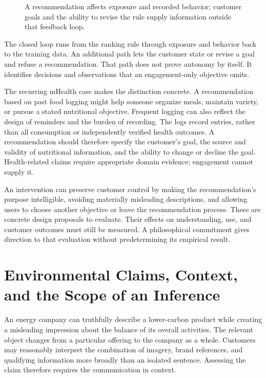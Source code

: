 \begin{figure}[htbp]
\centering

\caption{A recommendation affects exposure and recorded behavior; customer goals and the ability to revise the rule supply information outside that feedback loop.}\label{fig:M09_goal_revision}
\end{figure}

The closed loop runs from the ranking rule through exposure and behavior
back to the training data. An additional path lets the customer state or
revise a goal and refuse a recommendation. That path does not prove
autonomy by itself. It identifies decisions and observations that an
engagement-only objective omits.

The recurring mHealth case makes the distinction concrete. A
recommendation based on past food logging might help someone organize
meals, maintain variety, or pursue a stated nutritional objective.
Frequent logging can also reflect the design of reminders and the burden
of recording. The logs record entries, rather than all consumption or
independently verified health outcomes. A recommendation should
therefore specify the customer's goal, the source and validity of
nutritional information, and the ability to change or decline the goal.
Health-related claims require appropriate domain evidence; engagement
cannot supply it.

An intervention can preserve customer control by making the
recommendation's purpose intelligible, avoiding materially misleading
descriptions, and allowing users to choose another objective or leave
the recommendation process. These are concrete design proposals to
evaluate. Their effects on understanding, use, and customer outcomes
must still be measured. A philosophical commitment gives direction to
that evaluation without predetermining its empirical result.


\hypertarget{M09-environmental-claims-context-and-the-scope-of-an-inference}{%
\section{Environmental Claims, Context, and the Scope of an
Inference}\label{M09-environmental-claims-context-and-the-scope-of-an-inference}}

\noindent \noindent An energy company can truthfully describe a lower-carbon
product while creating a misleading impression about the balance of its
overall activities. The relevant object changes from a particular
offering to the company as a whole. Customers may reasonably interpret
the combination of imagery, brand references, and qualifying information
more broadly than an isolated sentence. Assessing the claim therefore
requires the communication in context.

